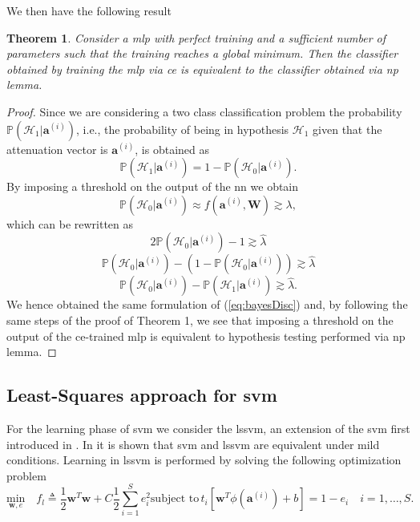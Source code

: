 \documentclass[draftcls,onecolumn,12pt]{IEEEtran}
\newtheorem{theorem}{Theorem}
\begin{document}
We then have the following result
\begin{theorem}
\label{th:nn_np2}
Consider a \ac{mlp} with perfect training and a sufficient number of parameters such that the training reaches a global minimum. Then the classifier obtained by training the \ac{mlp} via \ac{ce} is equivalent to the classifier obtained via \ac{np} lemma.
\end{theorem}
\begin{proof}
Since we are considering a two class classification problem the probability $\mathbb{P}(\mathcal{H}_1|\bm{a}^{(i)})$, i.e., the probability of being in hypothesis $\mathcal{H}_1$ given that the attenuation vector is $\bm{a}^{(i)}$, is obtained as
\begin{equation}
    \mathbb{P}(\mathcal{H}_1|\bm{a}^{(i)}) = 1- \mathbb{P}(\mathcal{H}_0|\bm{a}^{(i)}).
\end{equation}
By imposing a threshold on the output of the \ac{nn} we obtain
\begin{equation}
    \mathbb{P}(\mathcal{H}_0|\bm{a}^{(i)}) \approx  f(\bm{a}^{(i)},\bm{W}) \gtrsim \lambda,
\end{equation}
which can be rewritten as
\begin{equation}
    2\mathbb{P}(\mathcal{H}_0|\bm{a}^{(i)})-1 \gtrsim \hat{\lambda}
\end{equation}
\begin{equation}
    \mathbb{P}(\mathcal{H}_0|\bm{a}^{(i)})-(1-\mathbb{P}(\mathcal{H}_0|\bm{a}^{(i)})) \gtrsim \hat{\lambda}
\end{equation}
\begin{equation}
    \mathbb{P}(\mathcal{H}_0|\bm{a}^{(i)})-\mathbb{P}(\mathcal{H}_1|\bm{a}^{(i)}) \gtrsim \hat{\lambda}.
\end{equation}
We hence obtained the same formulation of (\ref{eq:bayesDisc}) and, by following the same steps of the proof of Theorem 1, we see that imposing a threshold on the output of the \ac{ce}-trained \ac{mlp} is equivalent to hypothesis testing performed via \ac{np} lemma.
\end{proof}


\subsection{Least-Squares approach for \ac{svm}}
For the learning phase of \ac{svm} we consider the \ac{lssvm}, an extension of the \ac{svm} first introduced in \cite{Suykens1999}. In \cite{Yevs} it is shown that  \ac{svm} and \ac{lssvm} are equivalent under mild conditions. Learning in \ac{lssvm} is performed by solving the following optimization problem
\begin{subequations}
	\label{eq:lssvm}
	\begin{equation}
	\label{eq:lssvmOrig}
	\underset{\mathbf{w},e}{\text{min}} \quad f_l \triangleq \frac{1}{2} \mathbf{w}^T \mathbf{w} + C \frac{1}{2} \sum_{i=1}^S e_i ^2 
	\end{equation}
	\begin{equation}
	\label{eq:stpart}
	\text{subject to}\,  t_i[\mathbf{w}^T \phi (\mathbf{a}^{(i)}) + b] = 1- e_i\quad i = 1 ,\dots,S.
	\end{equation}
\end{subequations}
\end{document}
